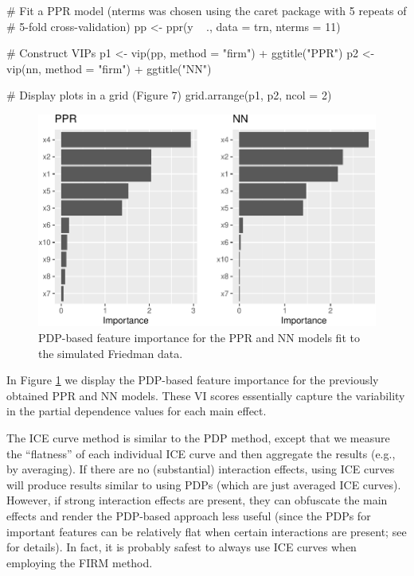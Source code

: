 \begin{Schunk}
\begin{Sinput}
# Fit a PPR model (nterms was chosen using the caret package with 5 repeats of
# 5-fold cross-validation)
pp <- ppr(y ~ ., data = trn, nterms = 11)

# Construct VIPs
p1 <- vip(pp, method = "firm") + ggtitle("PPR")
p2 <- vip(nn, method = "firm") + ggtitle("NN")

# Display plots in a grid (Figure 7)
grid.arrange(p1, p2, ncol = 2)
\end{Sinput}
\begin{figure}[!htb]

{\centering \includegraphics[width=0.7\linewidth]{greenwell-boehmke_files/figure-latex/pdp-ppr-nn-1}

}

\caption[PDP-based feature importance for the PPR and NN models fit to the simulated Friedman data]{PDP-based feature importance for the PPR and NN models fit to the simulated Friedman data.}\label{fig:pdp-ppr-nn}
\end{figure}
\end{Schunk}

In Figure \ref{fig:pdp-ppr-nn} we display the PDP-based feature
importance for the previously obtained PPR and NN models. These VI
scores essentially capture the variability in the partial dependence
values for each main effect.

The ICE curve method is similar to the PDP method, except that we
measure the ``flatness'' of each individual ICE curve and then aggregate
the results (e.g., by averaging). If there are no (substantial)
interaction effects, using ICE curves will produce results similar to
using PDPs (which are just averaged ICE curves). However, if strong
interaction effects are present, they can obfuscate the main effects and
render the PDP-based approach less useful (since the PDPs for important
features can be relatively flat when certain interactions are present;
see \citet{goldstein-peeking-2015} for details). In fact, it is probably
safest to always use ICE curves when employing the FIRM method.

